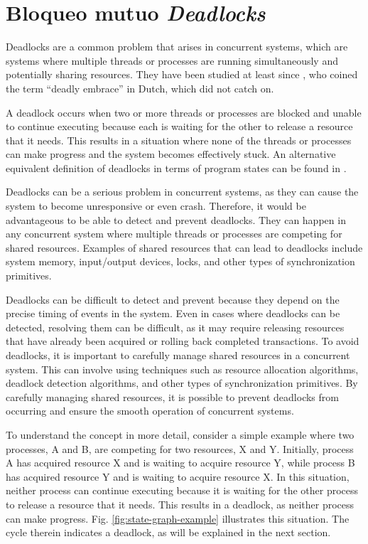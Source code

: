 \section{Bloqueo mutuo \textit{Deadlocks}}

Deadlocks are a common problem that arises in concurrent systems,
which are systems where multiple threads or processes are
running simultaneously and potentially sharing resources.
They have been studied at least since \cite{dijkstra1964},
who coined the term ``deadly embrace'' in Dutch, which did not catch on.

A deadlock occurs when two or more threads or processes
are blocked and unable to continue executing
because each is waiting for the other to release a resource that it needs.
This results in a situation where none of the threads or processes
can make progress and the system becomes effectively stuck.
An alternative equivalent definition of deadlocks
in terms of program states can be found in \cite{holt1972some}.

Deadlocks can be a serious problem in concurrent systems,
as they can cause the system to become unresponsive or even crash.
Therefore, it would be advantageous to be able to detect and prevent deadlocks.
They can happen in any concurrent system where multiple threads or processes
are competing for shared resources.
Examples of shared resources that can lead to deadlocks include system memory,
input/output devices, locks, and other types of synchronization primitives.

Deadlocks can be difficult to detect and prevent
because they depend on the precise timing of events in the system.
Even in cases where deadlocks can be detected, resolving them can be difficult,
as it may require releasing resources that have already been acquired or
rolling back completed transactions.
To avoid deadlocks, it is important to carefully
manage shared resources in a concurrent system.
This can involve using techniques such as resource allocation algorithms,
deadlock detection algorithms, and other types of synchronization primitives.
By carefully managing shared resources,
it is possible to prevent deadlocks from occurring and
ensure the smooth operation of concurrent systems.

To understand the concept in more detail,
consider a simple example where two processes, A and B,
are competing for two resources, X and Y.
Initially, process A has acquired resource X and is waiting to acquire resource Y,
while process B has acquired resource Y and is waiting to acquire resource X.
In this situation, neither process can continue executing
because it is waiting for the other process to release a resource that it needs.
This results in a deadlock, as neither process can make progress.
Fig. \ref{fig:state-graph-example} illustrates this situation.
The cycle therein indicates a deadlock, as will be explained in the next section.

